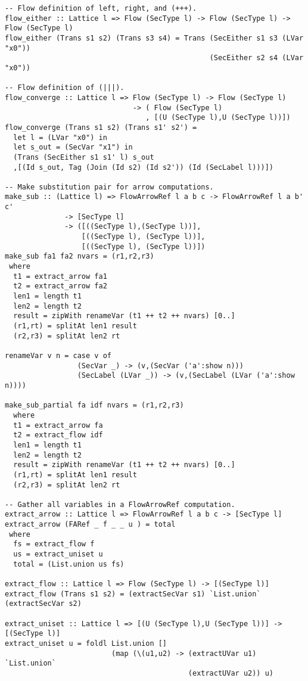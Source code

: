 \begin{Verbatim}[fontsize=\footnotesize,frame=lines,
                 framesep=5mm, label={[FlowArrowRef.hs]FlowArrowRef.hs}]
-- Flow definition of left, right, and (+++). 
flow_either :: Lattice l => Flow (SecType l) -> Flow (SecType l) -> Flow (SecType l)
flow_either (Trans s1 s2) (Trans s3 s4) = Trans (SecEither s1 s3 (LVar "x0")) 
                                                (SecEither s2 s4 (LVar "x0"))

-- Flow definition of (|||). 
flow_converge :: Lattice l => Flow (SecType l) -> Flow (SecType l) 
                              -> ( Flow (SecType l)
                                 , [(U (SecType l),U (SecType l))])
flow_converge (Trans s1 s2) (Trans s1' s2') =
  let l = (LVar "x0") in
  let s_out = (SecVar "x1") in 
  (Trans (SecEither s1 s1' l) s_out
  ,[(Id s_out, Tag (Join (Id s2) (Id s2')) (Id (SecLabel l)))])  

-- Make substitution pair for arrow computations. 
make_sub :: (Lattice l) => FlowArrowRef l a b c -> FlowArrowRef l a b' c' 
              -> [SecType l]
              -> ([((SecType l),(SecType l))],
                  [((SecType l), (SecType l))],
                  [((SecType l), (SecType l))])
make_sub fa1 fa2 nvars = (r1,r2,r3)
 where
  t1 = extract_arrow fa1
  t2 = extract_arrow fa2
  len1 = length t1
  len2 = length t2
  result = zipWith renameVar (t1 ++ t2 ++ nvars) [0..]
  (r1,rt) = splitAt len1 result
  (r2,r3) = splitAt len2 rt
  
renameVar v n = case v of
                 (SecVar _) -> (v,(SecVar ('a':show n)))
                 (SecLabel (LVar _)) -> (v,(SecLabel (LVar ('a':show n))))

make_sub_partial fa idf nvars = (r1,r2,r3)
  where
  t1 = extract_arrow fa
  t2 = extract_flow idf
  len1 = length t1
  len2 = length t2
  result = zipWith renameVar (t1 ++ t2 ++ nvars) [0..]
  (r1,rt) = splitAt len1 result
  (r2,r3) = splitAt len2 rt
  
-- Gather all variables in a FlowArrowRef computation. 
extract_arrow :: Lattice l => FlowArrowRef l a b c -> [SecType l]
extract_arrow (FARef _ f _ _ u ) = total
 where
  fs = extract_flow f
  us = extract_uniset u
  total = (List.union us fs) 

extract_flow :: Lattice l => Flow (SecType l) -> [(SecType l)]
extract_flow (Trans s1 s2) = (extractSecVar s1) `List.union` (extractSecVar s2)

extract_uniset :: Lattice l => [(U (SecType l),U (SecType l))] -> [(SecType l)]
extract_uniset u = foldl List.union [] 
                         (map (\(u1,u2) -> (extractUVar u1) `List.union` 
                                           (extractUVar u2)) u)


\end{Verbatim}
